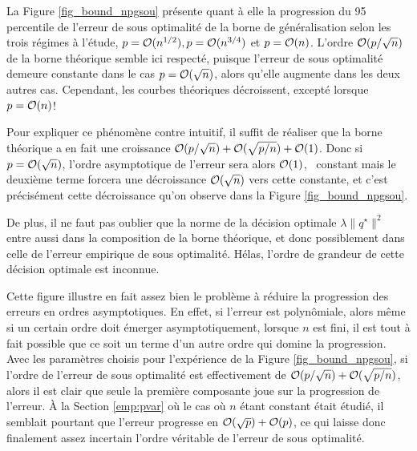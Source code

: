 La Figure \ref{fig_bound_npgsou} présente quant à elle la progression du 95\ieme
percentile de l'erreur de sous optimalité de la borne de généralisation selon les trois
régimes à l'étude, $p=\mathcal O(n^{1/2}),p=\mathcal O(n^{3/4})$ et $p=\mathcal O(n)$. L'ordre
$\mathcal O(p/\sqrt{n})$ de la borne théorique semble ici respecté, puisque l'erreur de sous
optimalité demeure constante dans le cas $p=\mathcal O(\sqrt{n})$, alors qu'elle augmente dans
les deux autres cas. Cependant, les courbes théoriques décroissent, excepté lorsque
$p=\mathcal O(n)$!

Pour expliquer ce phénomène contre intuitif, il suffit de réaliser que la borne théorique
a en fait une croissance $\mathcal O(p/\sqrt{n}) + \mathcal O(\sqrt{p/n}) + \mathcal O(1)$. Donc si
$p=\mathcal O(\sqrt{n})$, l'ordre asymptotique de l'erreur sera alors $\mathcal O(1)$, \ie\ constant
mais le deuxième terme forcera une décroissance $\mathcal O(\sqrt{n})$ vers cette constante, et
c'est précisément cette décroissance qu'on observe dans la Figure \ref{fig_bound_npgsou}.

De plus, il ne faut pas oublier que la norme de la décision optimale
$\lambda\|q^\star\|^2$ entre aussi dans la composition de la borne théorique, et donc possiblement
dans celle de l'erreur empirique de sous optimalité. Hélas, l'ordre de grandeur de cette
décision optimale est inconnue.

Cette figure illustre en fait assez bien le problème à réduire la progression des erreurs
en ordres asymptotiques. En effet, si l'erreur est polynômiale, alors même si un certain
ordre doit émerger asymptotiquement, lorsque $n$ est fini, il est tout à fait possible que
ce soit un terme d'un autre ordre qui domine la progression.  Avec les paramètres choisis
pour l'expérience de la Figure \ref{fig_bound_npgsou}, si l'ordre de l'erreur de sous
optimalité est effectivement de $\mathcal O(p/\sqrt{n}) + \mathcal O(\sqrt{p/n})$, alors il est
clair que seule la première composante joue sur la progression de l'erreur. À la Section
\ref{emp:pvar} où le cas où $n$ étant constant était étudié, il semblait pourtant que
l'erreur progresse en $\mathcal O(\sqrt{p}) + \mathcal O(p)$, ce qui laisse donc finalement assez
incertain l'ordre véritable de l'erreur de sous optimalité.


